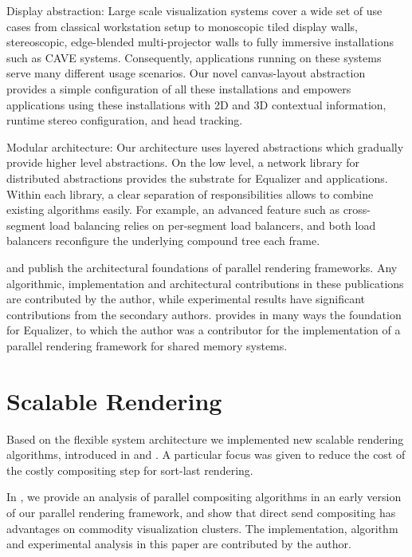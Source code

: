 \begin{compactdesc}
\item[Display abstraction:] Large scale visualization systems cover a wide set
of use cases from classical workstation setup to monoscopic tiled display
walls, stereoscopic, edge-blended multi-projector walls to fully immersive
installations such as CAVE systems. Consequently, applications running on these
systems serve many different usage scenarios. Our novel canvas-layout
abstraction provides a simple configuration of all these installations and
empowers applications using these installations with 2D and 3D contextual
information, runtime stereo configuration, and head tracking.

\item[Modular architecture:] Our architecture uses layered abstractions which
gradually provide higher level abstractions. On the low level, a network
library for distributed abstractions provides the substrate for Equalizer and
applications. Within each library, a clear separation of responsibilities
allows to combine existing algorithms easily. For example, an advanced feature
such as cross-segment load balancing relies on per-segment load balancers, and
both load balancers reconfigure the underlying compound tree each frame.

\end{compactdesc}

\cite{EMP:09} and \cite{ESP:18} publish the architectural foundations of
parallel rendering frameworks. Any algorithmic, implementation and
architectural contributions in these publications are contributed by the
author, while experimental results have significant contributions from the
secondary authors. \cite{BRE:05} provides in many ways the foundation for
Equalizer, to which the author was a contributor for the implementation of a
parallel rendering framework for shared memory systems.

\section{Scalable Rendering}

Based on the flexible system architecture we implemented new scalable rendering
algorithms, introduced in \cite{EMP:09} and \cite{ESP:18}. A particular focus
was given to reduce the cost of the costly compositing step for sort-last
rendering.

In \cite{EP:07}, we provide an analysis of parallel compositing algorithms in an
early version of our parallel rendering framework, and show that direct send
compositing has advantages on commodity visualization clusters. The
implementation, algorithm and experimental analysis in this paper are
contributed by the author.

